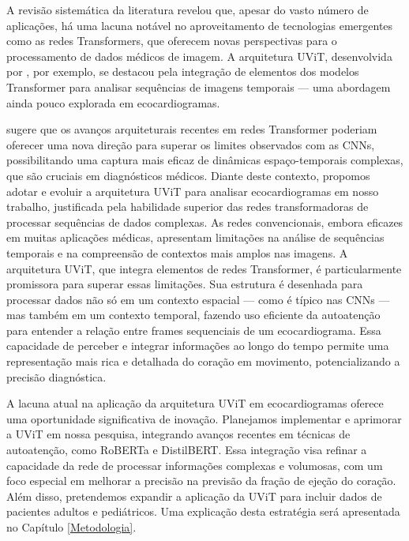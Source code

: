 A revisão sistemática da literatura revelou que, apesar do vasto número de aplicações, há uma lacuna notável no aproveitamento de tecnologias emergentes como as redes Transformers, que oferecem novas perspectivas para o processamento de dados médicos de imagem. A arquitetura UViT, desenvolvida por \textcite{Reynald}, por exemplo, se destacou pela integração de elementos dos modelos Transformer para analisar sequências de imagens temporais — uma abordagem ainda pouco explorada em ecocardiogramas.

\textcite{Atabansi2023} sugere que os avanços arquiteturais recentes em redes Transformer poderiam oferecer uma nova direção para superar os limites observados com as CNNs, possibilitando uma captura mais eficaz de dinâmicas espaço-temporais complexas, que são cruciais em diagnósticos médicos. Diante deste contexto, propomos adotar e evoluir a arquitetura UViT para analisar ecocardiogramas em nosso trabalho, justificada pela habilidade superior das redes transformadoras de processar sequências de dados complexas. As redes convencionais, embora eficazes em muitas aplicações médicas, apresentam limitações na análise de sequências temporais e na compreensão de contextos mais amplos nas imagens. A arquitetura UViT, que integra elementos de redes Transformer, é particularmente promissora para superar essas limitações. Sua estrutura é desenhada para processar dados não só em um contexto espacial — como é típico nas CNNs — mas também em um contexto temporal, fazendo uso eficiente da autoatenção para entender a relação entre frames sequenciais de um ecocardiograma. Essa capacidade de perceber e integrar informações ao longo do tempo permite uma representação mais rica e detalhada do coração em movimento, potencializando a precisão diagnóstica.

A lacuna atual na aplicação da arquitetura UViT em ecocardiogramas oferece uma oportunidade significativa de inovação. Planejamos implementar e aprimorar a UViT em nossa pesquisa, integrando avanços recentes em técnicas de autoatenção, como RoBERTa e DistilBERT. Essa integração visa refinar a capacidade da rede de processar informações complexas e volumosas, com um foco especial em melhorar a precisão na previsão da fração de ejeção do coração. Além disso, pretendemos expandir a aplicação da UViT para incluir dados de pacientes adultos e pediátricos. Uma explicação  desta estratégia  será apresentada no Capítulo \ref{Metodologia}. 


